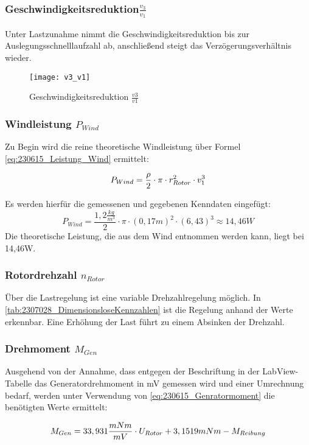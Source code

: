 \subsubsection*{Geschwindigkeitsreduktion$\frac{v_3}{v_1}$}
Unter Lastzunahme nimmt die Geschwindigkeitsreduktion bis zur Auslegungsschnelllaufzahl ab, anschließend steigt das Verzögerungsverhältnis wieder. 
\begin{figure}[H]
    \centering
    \texttt{[image: v3\_v1]}
    \caption{Geschwindigkeitsreduktion $\frac{v3}{v1}$}
    \label{fig:Geschwindigkeitsreduktion}
\end{figure}

\subsubsection*{Windleistung $P_{Wind}$}
Zu Begin wird die reine theoretische Windleistung über Formel \autoref{eq:230615_Leistung_Wind} ermittelt:

\begin{equation}
    \centering
    P_{Wind} = \frac{\rho}{2} \cdot \pi \cdot r_{Rotor}^2 \cdot v_1^3
    \label{eq:230615_Leistung_Wind}
\end{equation}

Es werden hierfür die gemessenen und gegebenen Kenndaten eingefügt:
$$P_{Wind} = \frac{1,2 \frac{kg}{m^3}}{2} \cdot \pi \cdot (0,17 m)^2 \cdot (6,43)^3 \approx 14,46 W$$
Die theoretische Leistung, die aus dem Wind entnommen werden kann, liegt bei 14,46W.

\subsubsection*{Rotordrehzahl $n_{Rotor}$}
Über die Lastregelung ist eine variable Drehzahlregelung möglich. In \autoref{tab:2307028_DimensionsloseKennzahlen} ist die Regelung anhand der Werte erkennbar. Eine Erhöhung der Last führt zu einem Absinken der Drehzahl.
\subsubsection*{Drehmoment $M_{Gen}$}
Ausgehend von der Annahme,
dass entgegen der Beschriftung in der LabView-Tabelle das Generatordrehmoment in mV gemessen wird und einer Umrechnung bedarf, 
werden unter Verwendung von \autoref{eq:230615_Genratormoment} die benötigten Werte ermittelt:

\begin{equation}
    \centering
    M_{Gen} = 33,931\frac{mNm}{mV} \cdot U_{Rotor} + 3,1519 mNm - M_{Reibung}
    \label{eq:230615_Genratormoment}
\end{equation}

